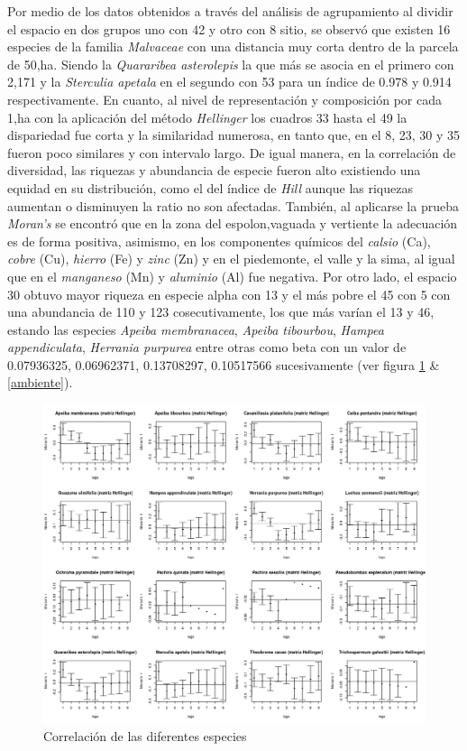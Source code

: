 \documentclass[11pt,]{article}
\begin{document}
Por medio de los datos obtenidos a través del análisis de agrupamiento
al dividir el espacio en dos grupos uno con 42 y otro con 8 sitio, se
observó que existen 16 especies de la familia \emph{Malvaceae} con una
distancia muy corta dentro de la parcela de 50,ha. Siendo la
\emph{Quararibea asterolepis} la que más se asocia en el primero con
2,171 y la \emph{Sterculia apetala} en el segundo con 53 para un índice
de 0.978 y 0.914 respectivamente. En cuanto, al nivel de representación
y composición por cada 1,ha con la aplicación del método
\emph{Hellinger} los cuadros 33 hasta el 49 la dispariedad fue corta y
la similaridad numerosa, en tanto que, en el 8, 23, 30 y 35 fueron poco
similares y con intervalo largo. De igual manera, en la correlación de
diversidad, las riquezas y abundancia de especie fueron alto existiendo
una equidad en su distribución, como el del índice de \emph{Hill} aunque
las riquezas aumentan o disminuyen la ratio no son afectadas. También,
al aplicarse la prueba \emph{Moran's} se encontró que en la zona del
espolon,vaguada y vertiente la adecuación es de forma positiva,
asimismo, en los componentes químicos del \emph{calsio} (Ca),
\emph{cobre} (Cu), \emph{hierro} (Fe) y \emph{zinc} (Zn) y en el
piedemonte, el valle y la sima, al igual que en el \emph{manganeso} (Mn)
y \emph{aluminio} (Al) fue negativa. Por otro lado, el espacio 30 obtuvo
mayor riqueza en especie alpha con 13 y el más pobre el 45 con 5 con una
abundancia de 110 y 123 cosecutivamente, los que más varían el 13 y 46,
estando las especies \emph{Apeiba membranacea}, \emph{Apeiba tibourbou},
\emph{Hampea appendiculata}, \emph{Herrania purpurea} entre otras como
beta con un valor de 0.07936325, 0.06962371, 0.13708297, 0.10517566
sucesivamente (ver figura \ref{diversidad} \& \ref{ambiente}).

\begin{figure}
\centering
\includegraphics[width=1.00000\textwidth]{ecologia_espacial_files/figure-markdown_github/unnamed-chunk-10-1.png}
\caption{Correlación de las diferentes especies\label{diversidad}}
\end{figure}
\end{document}
